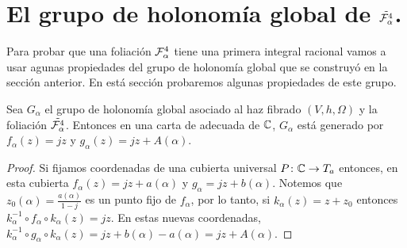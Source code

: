 \section{El grupo de holonomía global de $\tilde{\mathcal{F}_{\alpha}^{4}}$.}

Para probar que una foliación $\mathcal{F}_{\alpha}^{4}$ tiene una primera integral racional vamos a usar agunas propiedades del grupo de holonomía global que se construyó en la sección anterior. En está sección probaremos algunas propiedades de este grupo. 

\begin{Lema}
\label{Prop:GrupoHolonomia}
Sea $G_{\alpha}$ el grupo de holonomía global asociado al haz fibrado $(V,h,\Omega)$ y la foliación $\tilde{\mathcal{F}_{\alpha}^{4}}$. Entonces en una carta de adecuada de $\mathbb{C}$, $G_{\alpha}$ está generado por $f_{\alpha}(z)=jz$ y $g_{\alpha}(z)=jz+A(\alpha)$.
\end{Lema}
\begin{proof}
Si fijamos coordenadas de una cubierta universal $P\colon \mathbb{C}\rightarrow T_{a}$ entonces, en esta cubierta $f_{\alpha}(z)=jz+a(\alpha)$ y $g_{\alpha}=jz+b(\alpha)$. Notemos que $z_{0}(\alpha)=\tfrac{a(\alpha)}{1-j}$ es un punto fijo de $f_{\alpha}$, por lo tanto, si $k_{\alpha}(z)=z+z_{0}$ entonces $k_{\alpha}^{-1}\circ f_{\alpha}\circ k_{\alpha}(z)=jz$. En estas nuevas coordenadas, $k_{\alpha}^{-1}\circ g_{\alpha}\circ k_{\alpha}(z)=jz+b(\alpha)-a(\alpha)=jz+A(\alpha)$. 
\end{proof}

